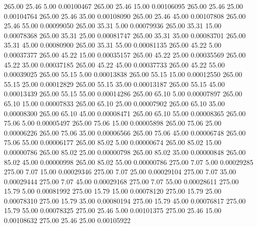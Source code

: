     265.00     25.46      5.00     0.00100467
    265.00     25.46     15.00     0.00106095
    265.00     25.46     25.00     0.00104764
    265.00     25.46     35.00     0.00108090
    265.00     25.46     45.00     0.00107808
    265.00     25.46     55.00     0.00099050
    265.00     35.31      5.00     0.00079936
    265.00     35.31     15.00     0.00078368
    265.00     35.31     25.00     0.00081747
    265.00     35.31     35.00     0.00083701
    265.00     35.31     45.00     0.00080900
    265.00     35.31     55.00     0.00081135
    265.00     45.22      5.00     0.00037377
    265.00     45.22     15.00     0.00035157
    265.00     45.22     25.00     0.00035569
    265.00     45.22     35.00     0.00037185
    265.00     45.22     45.00     0.00037733
    265.00     45.22     55.00     0.00039025
    265.00     55.15      5.00     0.00013838
    265.00     55.15     15.00     0.00012550
    265.00     55.15     25.00     0.00012829
    265.00     55.15     35.00     0.00013187
    265.00     55.15     45.00     0.00013439
    265.00     55.15     55.00     0.00014286
    265.00     65.10      5.00     0.00007897
    265.00     65.10     15.00     0.00007833
    265.00     65.10     25.00     0.00007902
    265.00     65.10     35.00     0.00008300
    265.00     65.10     45.00     0.00008471
    265.00     65.10     55.00     0.00008365
    265.00     75.06      5.00     0.00005497
    265.00     75.06     15.00     0.00005898
    265.00     75.06     25.00     0.00006226
    265.00     75.06     35.00     0.00006566
    265.00     75.06     45.00     0.00006748
    265.00     75.06     55.00     0.00006177
    265.00     85.02      5.00     0.00000674
    265.00     85.02     15.00     0.00000786
    265.00     85.02     25.00     0.00000798
    265.00     85.02     35.00     0.00000848
    265.00     85.02     45.00     0.00000998
    265.00     85.02     55.00     0.00000786
    275.00      7.07      5.00     0.00029285
    275.00      7.07     15.00     0.00029346
    275.00      7.07     25.00     0.00029104
    275.00      7.07     35.00     0.00029444
    275.00      7.07     45.00     0.00029168
    275.00      7.07     55.00     0.00028611
    275.00     15.79      5.00     0.00081992
    275.00     15.79     15.00     0.00078120
    275.00     15.79     25.00     0.00078310
    275.00     15.79     35.00     0.00080194
    275.00     15.79     45.00     0.00076817
    275.00     15.79     55.00     0.00078325
    275.00     25.46      5.00     0.00101375
    275.00     25.46     15.00     0.00108632
    275.00     25.46     25.00     0.00105922
